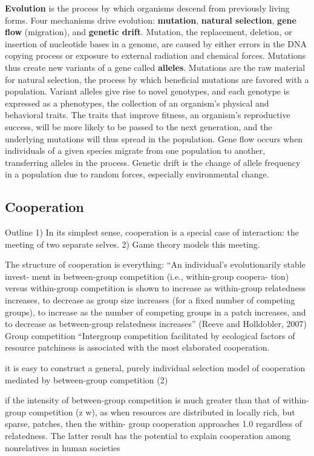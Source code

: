 \documentclass{tufte-book} %
\begin{document}
\textbf{Evolution} is the process by which organisms descend from previously living forms. Four mechanisms drive evolution: \textbf{mutation}, \textbf{natural selection}, \textbf{gene flow} (migration), and \textbf{genetic drift}. Mutation, the replacement, deletion, or insertion of nucleotide bases in a genome, are caused by either errors in the DNA copying process or exposure to external radiation and chemical forces. Mutations thus create new variants of a gene called \textbf{alleles}. Mutations are the raw material for natural selection, the process by which beneficial mutations are favored with a population. Variant alleles give rise to novel genotypes, and each genotype is expressed as a phenotypes, the collection of an organism’s physical and behavioral traits. The traits that improve fitness, an organism’s reproductive success, will be more likely to be passed to the next generation, and the underlying mutations will thus spread in the population. Gene flow occurs when individuals of a given species migrate from one population to another, transferring alleles in the process. Genetic drift is the change of allele frequency in a population due to random forces, especially environmental change.


\subsection{Cooperation}\label{sec:cooperation}


Outline
	1)	In its simplest sense, cooperation is a special case of interaction: the meeting of two separate selves.
	2)	Game theory models this meeting.

The structure of cooperation is everything: “An individual’s evolutionarily stable invest- ment in between-group competition (i.e., within-group coopera- tion) versus within-group competition is shown to increase as within-group relatedness increases, to decrease as group size increases (for a fixed number of competing groups), to increase as the number of competing groups in a patch increases, and to decrease as between-group relatedness increases” (Reeve and Holldobler, 2007)
Group competition
“Intergroup competition facilitated by ecological factors of resource patchiness is associated with the most elaborated cooperation.

it is easy to construct a general, purely individual selection model of cooperation mediated by between-group competition (2)

if the intensity of between-group competition is much greater than that of within-group competition (z w), as when resources are distributed in locally rich, but sparse, patches, then the within- group cooperation approaches 1.0 regardless of relatedness. The latter result has the potential to explain cooperation among nonrelatives in human societies
\end{document}
